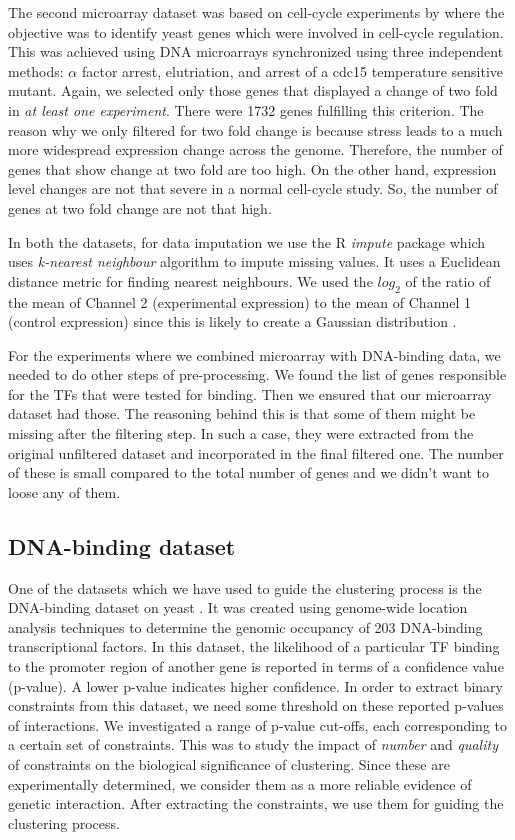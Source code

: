 The second microarray dataset was based on cell-cycle experiments by \citet{spellman98comprehensive} where the objective was to identify yeast genes which were involved in cell-cycle regulation. This was achieved using DNA microarrays synchronized using three independent methods: $\alpha$ factor arrest, elutriation, and arrest of a cdc15 temperature sensitive mutant. Again, we selected only those genes that displayed a change of two fold in \textit{at least one experiment}. There were 1732 genes fulfilling this criterion. The reason why we only filtered for two fold change is because stress leads to a much more widespread expression change across the genome. Therefore, the number of genes that show change at two fold are too high. On the other hand, expression level changes are not that severe in a normal cell-cycle study. So, the number of genes at two fold change are not that high.

In both the datasets, for data imputation we use the R \textit{impute} package which uses \textit{k-nearest neighbour} algorithm to impute missing values. It uses a Euclidean distance metric for finding nearest neighbours. We used the $log_{2}$ of the ratio of the mean of Channel 2 (experimental expression) to the mean of Channel 1 (control expression) since this is likely to create a Gaussian distribution \citep{ernstwit2004statis_microarrays}.

For the experiments where we combined microarray with DNA-binding data, we needed to do other steps of pre-processing. We found the list of genes responsible for the TFs that were tested for binding. Then we ensured that our microarray dataset had those. The reasoning behind this is that some of them might be missing after the filtering step. In such a case, they were extracted from the original unfiltered dataset and incorporated in the final filtered one. The number of these is small compared to the total number of genes and we didn't want to loose any of them.

\subsection{DNA-binding dataset}
One of the datasets which we have used to guide the clustering process is the DNA-binding dataset on yeast \citep{harbison04transcriptional}. It was created using genome-wide 
location analysis techniques to determine the genomic occupancy of 203 DNA-binding transcriptional factors. In this dataset, the likelihood of a particular TF 
binding to the promoter region of another gene is reported in terms of a confidence value (p-value). A lower p-value indicates higher confidence. In order to extract binary 
constraints from this dataset, we need some threshold on these reported p-values of interactions. We investigated a range of p-value cut-offs, each corresponding to a 
certain set of constraints. This was to study the impact of \textit{number} and \textit{quality} of constraints on the biological significance of clustering. 
Since these are experimentally determined, we consider them as a more reliable evidence of genetic interaction. After extracting the constraints, we use them for 
guiding the clustering process. 


